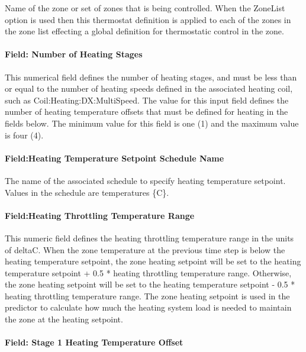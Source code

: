 Name of the zone or set of zones that is being controlled. When the ZoneList option is used then this thermostat definition is applied to each of the zones in the zone list effecting a global definition for thermostatic control in the zone.

\paragraph{Field: Number of Heating Stages}\label{field-number-of-heating-stages}

This numerical field defines the number of heating stages, and must be less than or equal to the number of heating speeds defined in the associated heating coil, such as Coil:Heating:DX:MultiSpeed. The value for this input field defines the number of heating temperature offsets that must be defined for heating in the fields below. The minimum value for this field is one (1) and the maximum value is four (4).

\paragraph{Field:Heating Temperature Setpoint Schedule Name}\label{fieldheating-temperature-setpoint-schedule-name}

The name of the associated schedule to specify heating temperature setpoint. Values in the schedule are temperatures \{C\}.

\paragraph{Field:Heating Throttling Temperature Range}\label{fieldheating-throttling-temperature-range}

This numeric field defines the heating throttling temperature range in the units of deltaC. When the zone temperature at the previous time step is below the heating temperature setpoint, the zone heating setpoint will be set to the heating temperature setpoint + 0.5 * heating throttling temperature range. Otherwise, the zone heating setpoint will be set to the heating temperature setpoint - 0.5 * heating throttling temperature range. The zone heating setpoint is used in the predictor to calculate how much the heating system load is needed to maintain the zone at the heating setpoint.

\paragraph{Field: Stage 1 Heating Temperature Offset}\label{field-stage-1-heating-temperature-offset}

